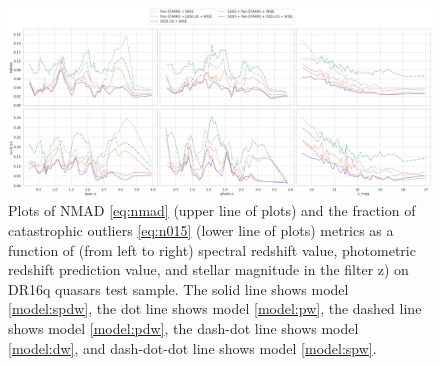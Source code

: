 \documentclass[fleqn,usenatbib]{mnras}
\begin{document}
\begin{figure}
    \centering
    \includegraphics[width=0.9\linewidth]{images/metrics-dr16q-ab-mini.png}
    \caption{Plots of NMAD \eqref{eq:nmad} (upper line of plots) and the fraction of catastrophic outliers \eqref{eq:n015} (lower line of plots) metrics as a function of (from left to right) spectral redshift value, photometric redshift prediction value, and stellar magnitude in the filter z) on DR16q quasars test sample. The solid line shows model \ref{model:spdw}, the dot line shows model \ref{model:pw}, the dashed line shows model \ref{model:pdw}, the dash-dot line shows model \ref{model:dw}, and dash-dot-dot line shows model \ref{model:spw}.}
    \label{fig:metrics-dr16q}
\end{figure}
\end{document}

